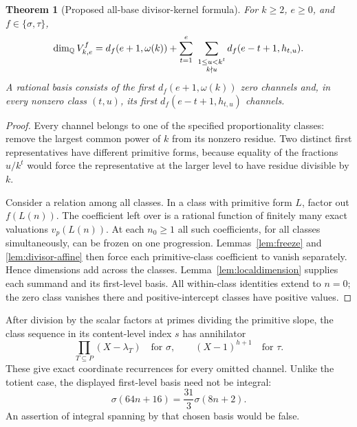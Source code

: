 \documentclass[11pt,a4paper]{article}
\newtheorem{theorem}{Theorem}[section]
\theoremstyle{definition}\newtheorem{definition}[theorem]{Definition}
\theoremstyle{remark}\newtheorem*{remark}{Remark}
\begin{document}
\begin{theorem}[Proposed all-base divisor-kernel formula]\label{thm:divisor-rank}
For $k\ge2$, $e\ge0$, and $f\in\{\sigma,\tau\}$,
\begin{equation}\label{eq:rankformula}
 \dim_\mathbb Q V^f_{k,e}
 =d_f(e+1,\omega(k))+
 \sum_{t=1}^e\ \sum_{\substack{1\le u<k^t\\ k\nmid u}}
       d_f(e-t+1,h_{t,u}).
\end{equation}
A rational basis consists of the first $d_f(e+1,\omega(k))$ zero channels and,
in every nonzero class $(t,u)$, its first $d_f(e-t+1,h_{t,u})$ channels.
\end{theorem}
\begin{proof}
Every channel belongs to one of the specified proportionality classes:
remove the largest common power of $k$ from its nonzero residue. Two distinct
first representatives have different primitive forms, because equality of
the fractions $u/k^t$ would force the representative at the larger level to
have residue divisible by $k$.

Consider a relation among all classes. In a class with primitive form $L$,
factor out $f(L(n))$. The coefficient left over is a rational function of
finitely many exact valuations $v_p(L(n))$. At each $n_0\ge1$ all such
coefficients, for all classes simultaneously, can be frozen on one
progression. Lemmas~\ref{lem:freeze} and \ref{lem:divisor-affine} then force
each primitive-class coefficient to vanish separately. Hence dimensions add
across the classes. Lemma~\ref{lem:localdimension} supplies each summand and
its first-level basis. All within-class identities extend to $n=0$; the zero
class vanishes there and positive-intercept classes have positive values.
\end{proof}

After division by the scalar factors at primes dividing the primitive slope,
the class sequence in its content-level index $s$ has annihilator
\[
 \prod_{T\subseteq P}(X-\lambda_T)\quad\text{for }\sigma,
 \qquad (X-1)^{h+1}\quad\text{for }\tau.
\]
These give exact coordinate recurrences for every omitted channel. Unlike the
totient case, the displayed first-level basis need not be integral:
\[
 \sigma(64n+16)=\frac{31}{3}\sigma(8n+2).
\]
An assertion of integral spanning by that chosen basis would be false.
\end{document}
